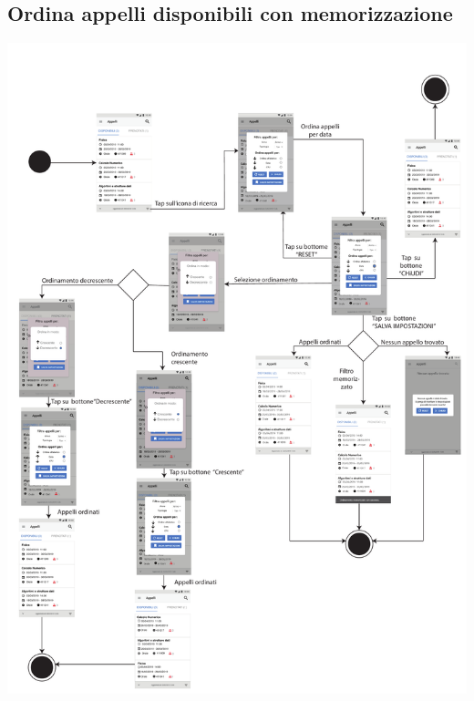 \subsection{Ordina appelli disponibili con memorizzazione }
\begin{center}
	\includegraphics[width=6in]{imgs/gruppo1/activity_diagrams/AD10_ordina_appelli.pdf}
\end{center}
\newpage


